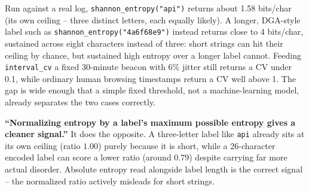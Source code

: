 Run against a real log, \texttt{shannon\_entropy("api")} returns about 1.58 bits/char (its own
ceiling -- three distinct letters, each equally likely). A longer, DGA-style label such as
\texttt{shannon\_entropy("4a6f68e9")} instead returns close to 4 bits/char, sustained across eight
characters instead of three: short strings can hit their ceiling by chance, but sustained high
entropy over a longer label cannot. Feeding
\texttt{interval\_cv} a fixed 30-minute beacon with 6\% jitter still returns a CV under 0.1, while
ordinary human browsing timestamps return a CV well above 1. The gap is wide enough that a simple
fixed threshold, not a machine-learning model, already separates the two cases correctly.

\begin{misconception}
\textbf{``Normalizing entropy by a label's maximum possible entropy gives a cleaner signal.''} It
does the opposite. A three-letter label like \texttt{api} already sits at its own ceiling
(ratio $1.00$) purely because it is short, while a 26-character encoded label can score a lower
ratio (around $0.79$) despite carrying far more actual disorder. Absolute entropy read alongside
label length is the correct signal -- the normalized ratio actively misleads for short strings.
\end{misconception}

